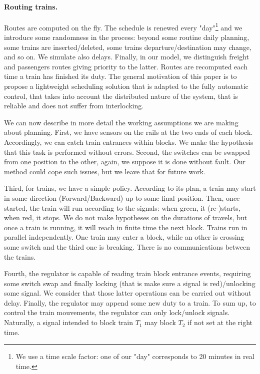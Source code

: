 \documentclass[runningheads]{llncs}
\begin{document}
\paragraph{Routing trains.}
Routes are computed on the fly. The schedule is renewed every "day"\footnote{We use a time scale factor: one of our "day" corresponds to 20 minutes in real time.}  and we introduce some randomness in the process: beyond some routine daily planning, some trains are inserted/deleted, some trains departure/destination may change, and so on. We simulate also delays. Finally, in our model, we distinguish freight and  passengers routes giving priority to the latter. Routes are recomputed each time a train has finished its duty. The general motivation of this paper is to propose a lightweight scheduling solution that is adapted to the fully automatic control, that takes into account the distributed nature of the system, that is reliable and does not suffer from interlocking.  
 
We can now describe in more detail the working assumptions we are making about planning.  First, we have sensors on the rails at the two ends of each block. Accordingly,  we can catch train entrances within blocks. We make the hypothesis that this task is performed without errors. Second, the switches can be swapped from one position to the other, again, we suppose it is done without fault. Our method could cope such issues, but we leave that for future work. 
 
  Third, for trains, we have a simple policy.  According to its plan, a train may start in some direction (Forward/Backward) up to some final position. Then, once started, the train will run according to the signals: when green, it (re-)starts, when red, it stops.  We do not make hypotheses on the durations of travels, but once a train is running, it will reach in finite time the next block. Trains run in parallel independently. One train may enter a block, while an other is crossing some switch and the third one is breaking. There is no communications between the trains.

Fourth,  the regulator is capable of reading train block entrance events, requiring some switch swap and finally locking (that is make sure a signal is red)/unlocking some signal. We consider that those latter operations can be carried out without delay. Finally, the regulator may append some new duty to a train. To sum up, to control the train mouvements, the regulator can only lock/unlock signals. Naturally, a signal intended to block train $T_1$ may block $T_2$ if not set at the right time.   
 
\end{document}
